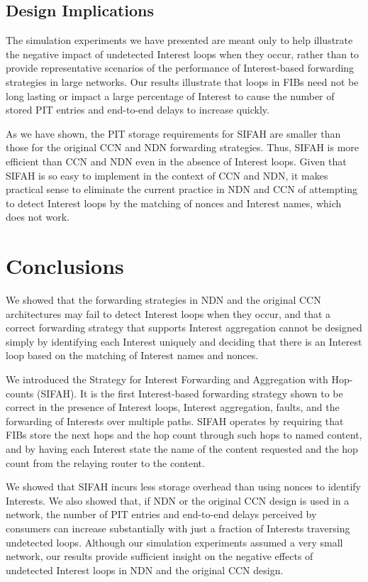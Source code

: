 \documentclass{ancs15-alternate}
\begin{document}
\subsection{Design Implications}

The simulation experiments we have presented are meant only to help illustrate the negative impact of undetected Interest loops when they occur, rather than to provide representative scenarios of the performance of 
Interest-based forwarding strategies in large networks. Our results illustrate that  loops in FIBs need not be long lasting or impact a large percentage of Interest to cause the number of  stored PIT entries and end-to-end delays to increase quickly.

As we have shown, the PIT storage requirements  for SIFAH are smaller than those for the original CCN and NDN forwarding strategies. Thus, SIFAH is more efficient than CCN and NDN even in the absence of Interest loops.
Given that SIFAH is so easy  to implement in the context of CCN and NDN, it makes practical sense to eliminate the current 
practice in NDN and CCN of  attempting to detect Interest loops by the matching of nonces 
and Interest names, which does not work.   

\section{Conclusions}

We  showed that the forwarding strategies in NDN and the original CCN architectures  may fail to detect Interest loops when they occur, and that a correct forwarding strategy that supports Interest aggregation cannot be designed simply by  identifying each Interest uniquely and deciding that there is an Interest loop based on the matching of Interest names and nonces. 
 
We  introduced the Strategy for Interest  Forwarding and Aggregation with Hop-counts  (SIFAH). It  is the first Interest-based forwarding strategy shown to be correct in the presence of Interest loops, Interest aggregation, faults, and the forwarding of Interests over multiple paths. SIFAH operates by requiring that FIBs store the next hops and the hop count through such hops to named content, and by having each Interest state the name of the content requested and the hop count from the relaying router to the content. 

We showed that SIFAH incurs less storage overhead than using nonces to identify Interests. We also showed that, if NDN or the original CCN design  is used in a network,  the number of PIT entries and end-to-end delays perceived by consumers can increase substantially with just a fraction of Interests traversing undetected loops.  Although our  simulation experiments assumed a very small network,  our results provide sufficient insight on the negative effects of undetected Interest loops in NDN and the original CCN design.
\end{document}
